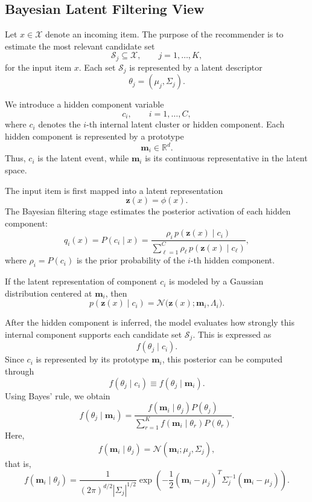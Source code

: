 \documentclass{article}
\begin{document}

\subsection{Bayesian Latent Filtering View}
\label{subsec:bayesian_latent_filtering_view}

Let \(x\in\mathcal{X}\) denote an incoming item. The purpose of the recommender is to estimate the most relevant candidate set
\[
\mathcal{S}_j\subseteq\mathcal{X},
\qquad j=1,\ldots,K,
\]
for the input item \(x\). Each set \(\mathcal{S}_j\) is represented by a latent descriptor
\[
\theta_j=(\mu_j,\Sigma_j).
\]

We introduce a hidden component variable
\[
c_i,\qquad i=1,\ldots,C,
\]
where \(c_i\) denotes the \(i\)-th internal latent cluster or hidden component. Each hidden component is represented by a prototype
\[
\mathbf{m}_i\in\mathbb{R}^{d}.
\]
Thus, \(c_i\) is the latent event, while \(\mathbf{m}_i\) is its continuous representative in the latent space.

The input item is first mapped into a latent representation
\[
\mathbf{z}(x)=\phi(x).
\]
The Bayesian filtering stage estimates the posterior activation of each hidden component:
\[
q_i(x)
=
P(c_i\mid x)
=
\frac{
	\rho_i\,p(\mathbf{z}(x)\mid c_i)
}{
	\sum_{\ell=1}^{C}
	\rho_\ell\,p(\mathbf{z}(x)\mid c_\ell)
},
\]
where \(\rho_i=P(c_i)\) is the prior probability of the \(i\)-th hidden component.

If the latent representation of component \(c_i\) is modeled by a Gaussian distribution centered at \(\mathbf{m}_i\), then
\[
p(\mathbf{z}(x)\mid c_i)
=
\mathcal{N}\big(\mathbf{z}(x);\mathbf{m}_i,\Lambda_i\big).
\]

After the hidden component is inferred, the model evaluates how strongly this internal component supports each candidate set \(\mathcal{S}_j\). This is expressed as
\[
f(\theta_j\mid c_i).
\]
Since \(c_i\) is represented by its prototype \(\mathbf{m}_i\), this posterior can be computed through
\[
f(\theta_j\mid c_i)
\equiv
f(\theta_j\mid \mathbf{m}_i).
\]
Using Bayes' rule, we obtain
\[
f(\theta_j\mid \mathbf{m}_i)
=
\frac{
	f(\mathbf{m}_i\mid \theta_j)P(\theta_j)
}{
	\sum_{r=1}^{K}
	f(\mathbf{m}_i\mid \theta_r)P(\theta_r)
}.
\]
Here,
\[
f(\mathbf{m}_i\mid \theta_j)
=
\mathcal{N}(\mathbf{m}_i;\mu_j,\Sigma_j),
\]
that is,
\[
f(\mathbf{m}_i\mid \theta_j)
=
\frac{1}{(2\pi)^{d/2}|\Sigma_j|^{1/2}}
\exp\left(
-\frac{1}{2}
(\mathbf{m}_i-\mu_j)^T
\Sigma_j^{-1}
(\mathbf{m}_i-\mu_j)
\right).
\]
\end{document}
